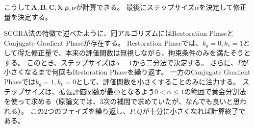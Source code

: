 \documentclass[a4paper]{bxjsarticle}
\begin{document}
	こうして$\bm{A},\bm{B},\bm{C},\bm{\lambda},\bm{\rho},\bm{\nu}$が計算できる。
	最後にステップサイズ$\alpha$を決定して修正量を決定する。
	
	SCGRA法の特徴で述べたように、同アルゴリズムにはRestoration PhaseとConjugate Gradient Phaseが存在する。
	Restoration Phaseでは、$k_g = 0, k_r=1$として得た修正量で、本来の評価関数は無視しながら、拘束条件のみを満たそうとする。
	このとき、ステップサイズは$\alpha = 1$から二分法で決定する。
	さらに、$P$が小さくなるまで何回もRestoration Phaseを繰り返す。
	一方のConjugate Gradient Phaseでは$k_g=1, k_r=0$として、評価関数を小さくすることのみに注力する。
	ステップサイズは、拡張評価関数が最小となるよう$0<\alpha\leq 1$の範囲で黄金分割法を使って求める（原論文では、3次の補間で求めていたが、なんでも良いと思われる）。
	この2つのフェイズを繰り返し、$P,Q$が十分に小さくなれば計算終了である。
	
\end{document}
